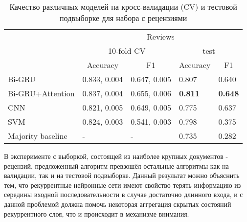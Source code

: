 \begin{table}[H]
	\centering
	\caption{Качество различных моделей на кросс-валидации (CV) и тестовой подвыборке для набора с рецензиями}
	\label{tab:res_kinopoisk}
	\begin{tabular}{l|l|l|l|l|}
        \cline{2-5}
                                                & \multicolumn{4}{c|}{Reviews}                                                                                      \\ \cline{2-5} 
                                                & \multicolumn{2}{c|}{10-fold CV}                         & \multicolumn{2}{c|}{test}                               \\ \cline{2-5} 
                                                & \multicolumn{1}{c|}{Accuracy} & \multicolumn{1}{c|}{F1} & \multicolumn{1}{c|}{Accuracy} & \multicolumn{1}{c|}{F1} \\ \hline
        \multicolumn{1}{|l|}{Bi-GRU}            & 0.833, 0.004                  & 0.647, 0.005            & 0.807                         & 0.640                   \\ \hline
        \multicolumn{1}{|l|}{Bi-GRU+Attention}  & 0.837, 0.004                  & 0.655, 0.006            & \textbf{0.811}                         & \textbf{0.648}                   \\ \hline
        \multicolumn{1}{|l|}{CNN}               & 0.821, 0.005                  & 0.649, 0.005            & 0.775                         & 0.637                   \\ \hline
        \multicolumn{1}{|l|}{SVM}               & 0.824, 0.003                  & 0.541, 0.003            & 0.798                         & 0.375                   \\ \hline
        \multicolumn{1}{|l|}{Majority baseline} & -                             & -                       & 0.735                         & 0.282                   \\ \hline
    \end{tabular}
\end{table}

В эксперименте с выборкой, состоящей из наиболее крупных документов - рецензий, предложенный алгоритм превзошёл остальные алгоритмы как на валидации, так и на тестовой подвыборке. Данный результат можно объяснить тем, что рекуррентные нейронные сети имеют свойство терять информацию из середины входной последовательности в случае достаточно длинного входа, и с данной проблемой должна помочь некоторая аггрегация скрытых состояний рекуррентного слоя, что и происходит в механизме внимания.
